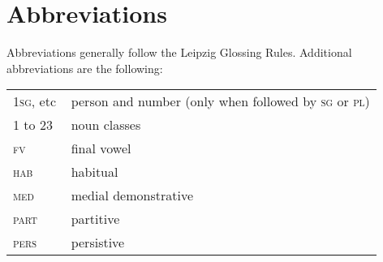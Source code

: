\documentclass[output=paper,colorlinks,citecolor=brown,
]{langscibook}
\begin{document}
\section*{Abbreviations}
Abbreviations generally follow the Leipzig Glossing Rules. Additional abbreviations are the following:

\begin{tabularx}{.45\textwidth}{lQ}
    1\textsc{sg}, etc\, & person and number (only when followed by \textsc{sg} or \textsc{pl})\\
    1 to 23 & noun classes\\
    \textsc{fv} & final vowel\\
    \textsc{hab} & habitual\\
    \textsc{med} & medial demonstrative\\
    \textsc{part} & partitive\\
    \textsc{pers} & persistive\\
\end{tabularx}


{\sloppy\printbibliography[heading=subbibliography,notkeyword=this]}
\end{document}
